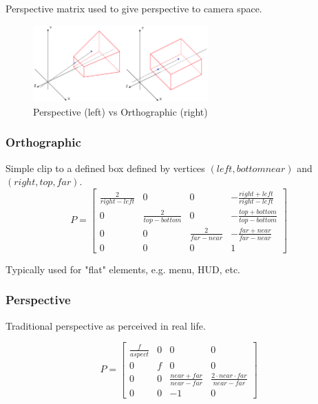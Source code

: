 \documentclass[a4paper]{article}
\begin{document}
Perspective matrix used to give perspective to camera space.

\begin{figure}[h!]
  \centering
  \includegraphics[width=0.6\textwidth]{graphics/perspective-orthographic.eps}
  \caption{Perspective (left) vs Orthographic (right)}
  \label{fig:perspective-orthographic}
\end{figure}
\FloatBarrier

\subsubsection{Orthographic}

Simple clip to a defined box defined by vertices $(left, bottom near)$ and
$(right, top, far)$.
\[
  P =
  \left [
    \begin{array}{cccc}
      \frac{2}{right - left}  & 0                       & 0                     & -\frac{right + left}{right - left} \\
      0                       & \frac{2}{top - bottom}  & 0                     & -\frac{top + bottom}{top - bottom} \\
      0                       & 0                       & \frac{2}{far - near}  & -\frac{far + near}{far - near} \\
      0                       & 0                       & 0                     & 1
    \end{array}
  \right ]
\]

Typically used for "flat" elements, e.g. menu, HUD, etc.

\subsubsection{Perspective}

Traditional perspective as perceived in real life.

\[
  P =
  \left [
    \begin{array}{cccc}
      \frac{f}{aspect}  & 0 & 0                             & 0 \\
      0                 & f & 0                             & 0 \\
      0                 & 0 & \frac{near + far}{near - far} & \frac{2 \cdot near \cdot far}{near - far} \\
      0                 & 0 & -1                            & 0
    \end{array}
  \right ]
\]
\end{document}
